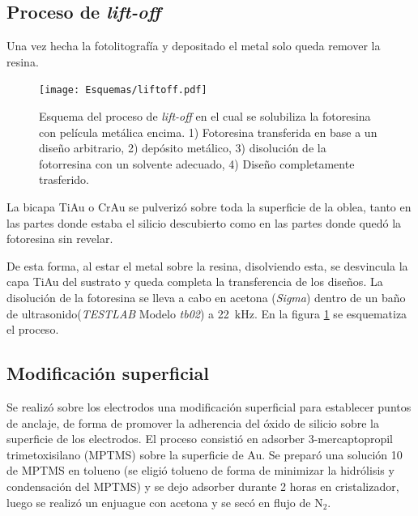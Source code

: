 	\subsection{Proceso de\textit{ lift-off}}
			Una vez hecha la fotolitografía y depositado el metal solo queda remover la resina.
					\begin{figure}[!ht]
							  \begin{center}
							  \texttt{[image: Esquemas/liftoff.pdf]}
							  \caption[Esquema del proceso de\textit{ lift-off}]{Esquema del proceso de\textit{ lift-off} en el cual se solubiliza la fotoresina con película metálica encima. 1) Fotoresina transferida en base a un diseño arbitrario, 2) depósito metálico, 3) disolución de la fotorresina con un solvente adecuado, 4) Diseño completamente trasferido.}
							  \label{esq:liftoff}
							  \end{center}
							  \end{figure}

		 La bicapa Ti\textbar Au o Cr\textbar Au se pulverizó sobre toda la superficie de la oblea, tanto en las partes donde estaba el silicio descubierto como en las partes donde quedó la fotoresina sin revelar. 
			
		De esta forma, al estar el metal sobre la resina, disolviendo esta, se desvincula la capa Ti\textbar Au del sustrato y queda completa la transferencia de los diseños. 
		La disolución de la fotoresina se lleva a cabo en acetona (\textit{Sigma}) dentro de un baño de ultrasonido(\textit{TESTLAB} Modelo \textit{tb02}) a \SI{22}{\kHz}. En la figura \ref{esq:liftoff} se esquematiza el proceso.

	\subsection{Modificación superficial}\label{sec:silanizacion}
		
		Se realizó sobre los electrodos una modificación superficial para establecer puntos de anclaje, de forma de promover la adherencia del óxido de silicio sobre la superficie de los electrodos.
		El proceso consistió en adsorber 3-mercaptopropil trimetoxisilano (MPTMS) sobre la superficie de Au. Se preparó una solución \SI{10}{\milli\Molar} de MPTMS en tolueno (se eligió tolueno de forma de minimizar la hidrólisis y condensación del MPTMS) y se dejo adsorber durante 2 horas en cristalizador, luego se realizó un enjuague con acetona y se secó en flujo de N$_2$.

